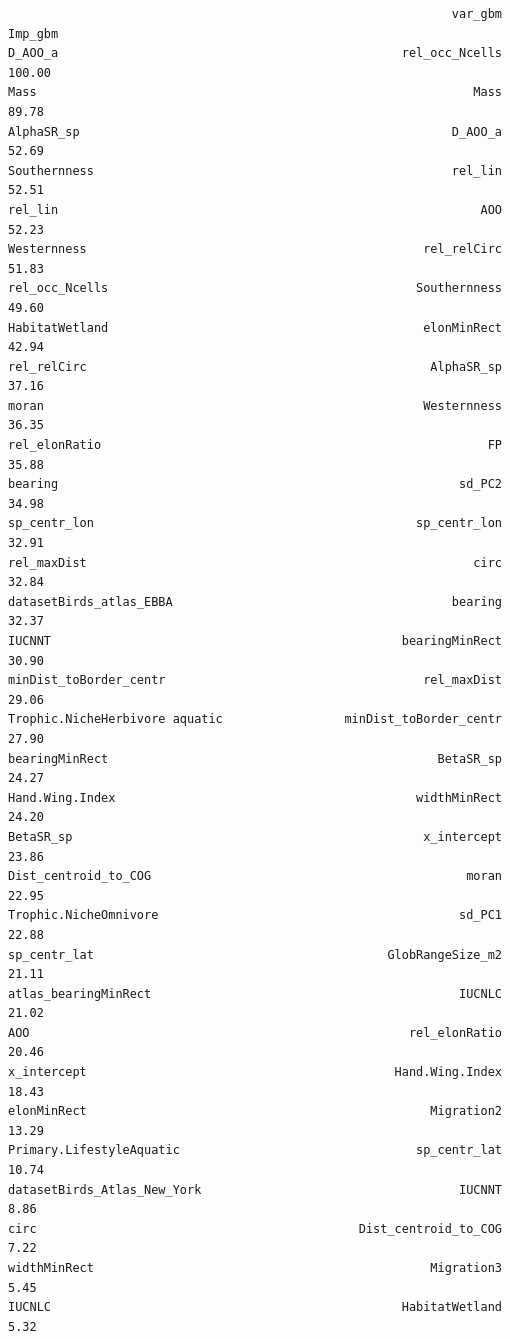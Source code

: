\documentclass[
  letterpaper,
  DIV=11,
  numbers=noendperiod]{scrreprt}
\begin{document}
\begin{verbatim}
                                                              var_gbm Imp_gbm
D_AOO_a                                                rel_occ_Ncells  100.00
Mass                                                             Mass   89.78
AlphaSR_sp                                                    D_AOO_a   52.69
Southernness                                                  rel_lin   52.51
rel_lin                                                           AOO   52.23
Westernness                                               rel_relCirc   51.83
rel_occ_Ncells                                           Southernness   49.60
HabitatWetland                                            elonMinRect   42.94
rel_relCirc                                                AlphaSR_sp   37.16
moran                                                     Westernness   36.35
rel_elonRatio                                                      FP   35.88
bearing                                                        sd_PC2   34.98
sp_centr_lon                                             sp_centr_lon   32.91
rel_maxDist                                                      circ   32.84
datasetBirds_atlas_EBBA                                       bearing   32.37
IUCNNT                                                 bearingMinRect   30.90
minDist_toBorder_centr                                    rel_maxDist   29.06
Trophic.NicheHerbivore aquatic                 minDist_toBorder_centr   27.90
bearingMinRect                                              BetaSR_sp   24.27
Hand.Wing.Index                                          widthMinRect   24.20
BetaSR_sp                                                 x_intercept   23.86
Dist_centroid_to_COG                                            moran   22.95
Trophic.NicheOmnivore                                          sd_PC1   22.88
sp_centr_lat                                         GlobRangeSize_m2   21.11
atlas_bearingMinRect                                           IUCNLC   21.02
AOO                                                     rel_elonRatio   20.46
x_intercept                                           Hand.Wing.Index   18.43
elonMinRect                                                Migration2   13.29
Primary.LifestyleAquatic                                 sp_centr_lat   10.74
datasetBirds_Atlas_New_York                                    IUCNNT    8.86
circ                                             Dist_centroid_to_COG    7.22
widthMinRect                                               Migration3    5.45
IUCNLC                                                 HabitatWetland    5.32

\end{verbatim}
\end{document}
